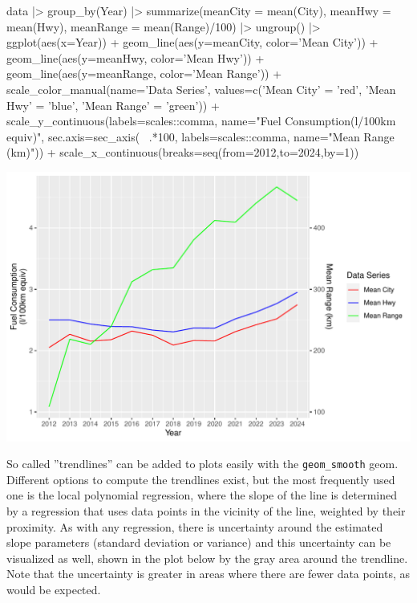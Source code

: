 \begin{samepage}
\begin{Rcode}
data |>
   group_by(Year) |>
   summarize(meanCity = mean(City), 
             meanHwy = mean(Hwy), 
             meanRange = mean(Range)/100) |>
   ungroup() |>
ggplot(aes(x=Year)) +
  geom_line(aes(y=meanCity, color='Mean City')) + 
  geom_line(aes(y=meanHwy, color='Mean Hwy')) +
  geom_line(aes(y=meanRange, color='Mean Range')) +
  scale_color_manual(name='Data Series', 
     values=c('Mean City' = 'red', 
              'Mean Hwy' = 'blue', 
              'Mean Range' = 'green')) +
  scale_y_continuous(labels=scales::comma, 
      name="Fuel Consumption\n(l/100km equiv)", 
      sec.axis=sec_axis(~ .*100, 
                        labels=scales::comma, 
                        name="Mean Range (km)")) + 
  scale_x_continuous(breaks=seq(from=2012,to=2024,by=1))
\end{Rcode}
\end{samepage}

\begin{center}
  \includegraphics[width=.8\textwidth]{fuel.linesTwoScales.pdf}
\end{center}

So called ''trendlines''  can be added to plots easily with the \texttt{geom\_smooth} geom. Different options to compute the trendlines exist, but the most frequently used one is the local polynomial regression, where the slope of the line is determined by a regression that uses data points in the vicinity of the line, weighted by their proximity. As with any regression, there is uncertainty around the estimated slope parameters (standard deviation or variance) and this uncertainty can be visualized as well, shown in the plot below by the gray area around the trendline. Note that the uncertainty is greater in areas where there are fewer data points, as would be expected.

